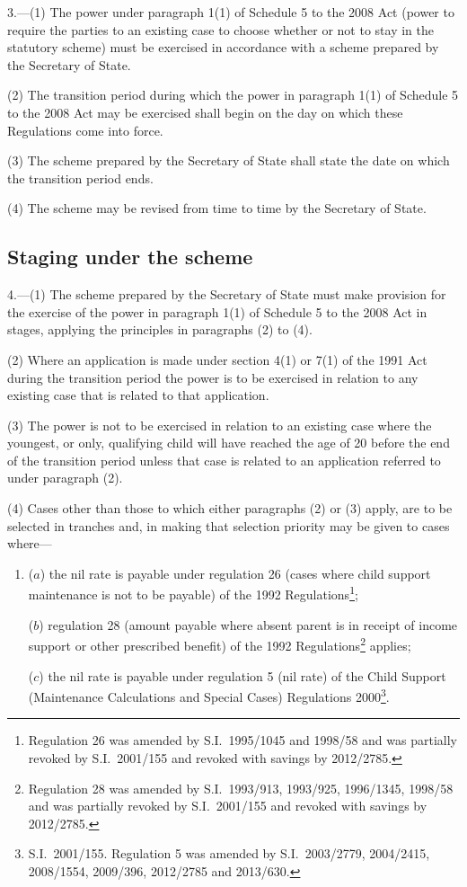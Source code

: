 \documentclass[12pt,a4paper]{article}
\begin{document}
3.—(1) The power under paragraph 1(1) of Schedule 5 to the 2008 Act (power to require the parties to an existing case to choose whether or not to stay in the statutory scheme) must be exercised in accordance with a scheme prepared by the Secretary of State.

(2) The transition period during which the power in paragraph 1(1) of Schedule 5 to the 2008 Act may be exercised shall begin on the day on which these Regulations come into force.

(3) The scheme prepared by the Secretary of State shall state the date on which the transition period ends.

(4) The scheme may be revised from time to time by the Secretary of State.

\subsection[4. Staging under the scheme]{Staging under the scheme}

4.—(1) The scheme prepared by the Secretary of State must make provision for the exercise of the power in paragraph 1(1) of Schedule 5 to the 2008 Act in stages, applying the principles in paragraphs (2) to (4).

(2) Where an application is made under section 4(1) or 7(1) of the 1991 Act during the transition period the power is to be exercised in relation to any existing case that is related to that application.

(3) The power is not to be exercised in relation to an existing case where the youngest, or only, qualifying child will have reached the age of 20 before the end of the transition period unless that case is related to an application referred to under paragraph (2).

(4) Cases other than those to which either paragraphs (2) or (3) apply, are to be selected in tranches and, in making that selection priority may be given to cases where—
\begin{enumerate}\item[]
($a$) the nil rate is payable under regulation 26 (cases where child support maintenance is not to be payable) of the 1992 Regulations\footnote{Regulation 26 was amended by S.I.~1995/1045 and 1998/58 and was partially revoked by S.I.~2001/155 and revoked with savings by 2012/2785.};

($b$) regulation 28 (amount payable where absent parent is in receipt of income support or other prescribed benefit) of the 1992 Regulations\footnote{Regulation 28 was amended by S.I.~1993/913, 1993/925, 1996/1345, 1998/58 and was partially revoked by S.I.~2001/155 and revoked with savings by 2012/2785.} applies;

($c$) the nil rate is payable under regulation 5 (nil rate) of the Child Support (Maintenance Calculations and Special Cases) Regulations 2000\footnote{S.I.~2001/155. Regulation 5 was amended by S.I.~2003/2779, 2004/2415, 2008/1554, 2009/396, 2012/2785 and 2013/630.}.
\end{enumerate}
\end{document}
